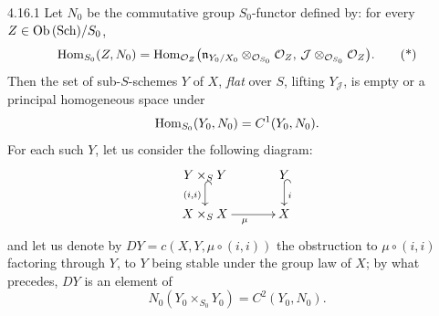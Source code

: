 \begin{definition}{4.16.1}\label{III.4.16.1}
Let \(N_0\) be the commutative group \(S_0\)-functor defined by: for every
\(Z\in\operatorname{Ob}\textup{(Sch)}/S_0\),
\begin{equation}
\operatorname{Hom}_{S_0}(Z,N_0)
=\operatorname{Hom}_{\mathcal{O}_Z}\bigl(
\mathfrak{n}_{Y_0/X_0}\otimes_{\mathcal{O}_{S_0}}\mathcal{O}_Z,\,
\mathcal{J}\otimes_{\mathcal{O}_{S_0}}\mathcal{O}_Z\bigr).
\tag{*}
\end{equation}
Then the set of sub-\(S\)-schemes \(Y\) of \(X\), \emph{flat} over \(S\),
lifting \(Y_{\mathcal{J}}\), is empty or a principal homogeneous space under
\[
\operatorname{Hom}_{S_0}(Y_0,N_0)=C^1(Y_0,N_0).
\]
For each such \(Y\), let us consider the following diagram:
\[
\xymatrix@C=3.4em@R=1.6em{
Y\times_S Y \ar@{^{(}->}[d]_{(i,i)} & Y \ar@{^{(}->}[d]^{i} \\
X\times_S X \ar[r]_{\mu} & X
}
\]
and let us denote by \(DY=c(X,Y,\mu\circ(i,i))\) the obstruction to
\(\mu\circ(i,i)\) factoring through \(Y\), \ie to \(Y\) being stable under
the group law of \(X\); by what precedes, \(DY\) is an element of
\[
N_0(Y_0\times_{S_0}Y_0)=C^2(Y_0,N_0).
\]
\end{definition}
